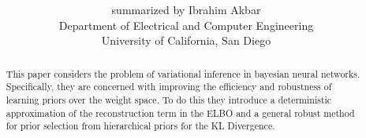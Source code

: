 \documentclass[conference, letterpaper, 10pt, twocolumn]{cls/IEEEtran}
\title{\LARGE \bf \thetitle%
}
\author{%
summarized by Ibrahim Akbar
\\
Department of Electrical and Computer Engineering\\
University of California, San Diego\\
%
}
\date{}
\let\appendices\relax
\theoremstyle{definition}
\theoremstyle{remark}
\begin{document}
\maketitle


\begin{abstract}
This paper considers the problem of variational inference in bayesian neural networks. Specifically, they are concerned with improving the efficiency and robustness of learning priors over the weight space. To do this they introduce a deterministic approximation of the reconstruction term in the ELBO and a general robust method for prior selection from hierarchical priors for the KL Divergence.
\end{abstract}







\appendices
% 




% 

\end{document}
